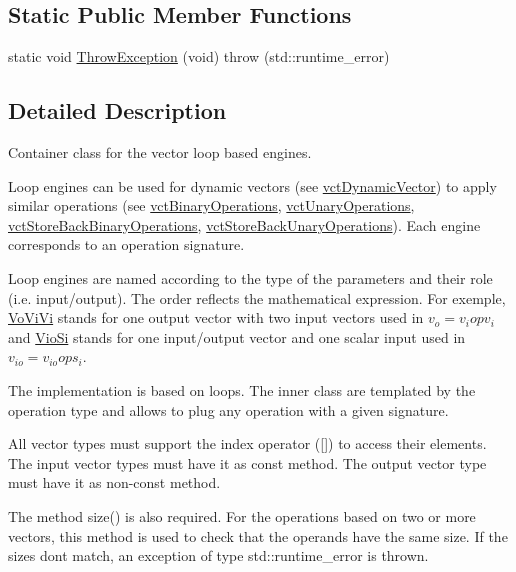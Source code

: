 \subsection*{Static Public Member Functions}
\begin{DoxyCompactItemize}
\item 
static void \hyperlink{classvct_dynamic_vector_loop_engines_a11c15e614e735c9fc969b955f967c5a8}{Throw\+Exception} (void)  throw (std\+::runtime\+\_\+error)
\end{DoxyCompactItemize}


\subsection{Detailed Description}
Container class for the vector loop based engines. 

Loop engines can be used for dynamic vectors (see \hyperlink{classvct_dynamic_vector}{vct\+Dynamic\+Vector}) to apply similar operations (see \hyperlink{classvct_binary_operations}{vct\+Binary\+Operations}, \hyperlink{classvct_unary_operations}{vct\+Unary\+Operations}, \hyperlink{classvct_store_back_binary_operations}{vct\+Store\+Back\+Binary\+Operations}, \hyperlink{classvct_store_back_unary_operations}{vct\+Store\+Back\+Unary\+Operations}). Each engine corresponds to an operation signature.

Loop engines are named according to the type of the parameters and their role (i.\+e. input/output). The order reflects the mathematical expression. For exemple, \hyperlink{classvct_dynamic_vector_loop_engines_1_1_vo_vi_vi}{Vo\+Vi\+Vi} stands for one output vector with two input vectors used in $v_o = v_i op v_i$ and \hyperlink{classvct_dynamic_vector_loop_engines_1_1_vio_si}{Vio\+Si} stands for one input/output vector and one scalar input used in $v_{io} = v_{io} op s_i$.

The implementation is based on loops. The inner class are templated by the operation type and allows to plug any operation with a given signature.

All vector types must support the index operator (\mbox{[}\mbox{]}) to access their elements. The input vector types must have it as const method. The output vector type must have it as non-\/const method.

The method size() is also required. For the operations based on two or more vectors, this method is used to check that the operands have the same size. If the sizes don\textquotesingle{}t match, an exception of type std\+::runtime\+\_\+error is thrown.

